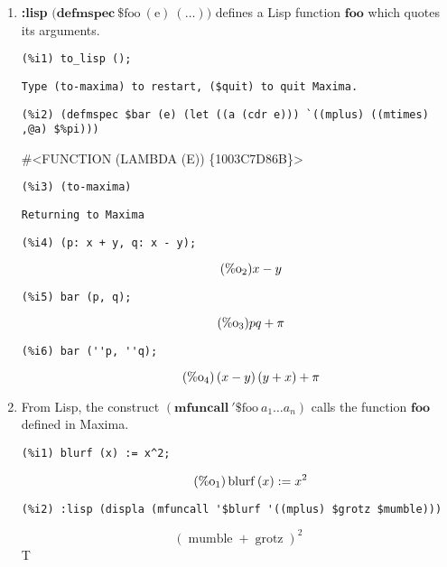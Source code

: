\documentclass[12pt,leqno]{article}
\begin{document}
\begin{enumerate}
\item {\bf :lisp} $\mathrm{(}\mathbf{defmspec\ } \mathrm{\$foo\ (e)\ (\ldots))}$
defines a Lisp function $\mathbf{foo}$ which quotes its arguments.
\begin{verbatim}
(%i1) to_lisp ();
\end{verbatim}
\begin{Verbatim}
Type (to-maxima) to restart, ($quit) to quit Maxima.
\end{Verbatim}
\begin{verbatim}
(%i2) (defmspec $bar (e) (let ((a (cdr e))) `((mplus) ((mtimes) ,@a) $%pi)))
\end{verbatim}
\#\textless FUNCTION (LAMBDA (E)) \{1003C7D86B\}\textgreater 
\begin{verbatim}
(%i3) (to-maxima)
\end{verbatim}
\begin{Verbatim}
Returning to Maxima
\end{Verbatim}
\begin{verbatim}
(%i4) (p: x + y, q: x - y);
\end{verbatim}
\begin{equation}
\tag{$\mathop{\mathrm{\%o}}_{2}$}x-y
\label{eq:doc-group1-code38-4-1}
\end{equation}
\begin{verbatim}
(%i5) bar (p, q);
\end{verbatim}
\begin{equation}
\tag{$\mathop{\mathrm{\%o}}_{3}$}p q+\pi
\label{eq:doc-group1-code38-5-1}
\end{equation}
\begin{verbatim}
(%i6) bar (''p, ''q);
\end{verbatim}
\begin{equation}
\tag{$\mathop{\mathrm{\%o}}_{4}$}\left(x-y\right) \left(y+x\right)+\pi
\label{eq:doc-group1-code38-6-1}
\end{equation}


\item From Lisp, the construct $(\mathbf{mfuncall\ '\$}\mathrm{foo\ }a_1 \ldots a_n)$
calls the function $\mathbf{foo}$ defined in Maxima.

\begin{verbatim}
(%i1) blurf (x) := x^2;
\end{verbatim}
\begin{equation}
\tag{$\mathop{\mathrm{\%o}}_{1}$}\mathop{\mathrm{blurf}}\left(x\right) := {x}^{2}
\label{eq:doc-group1-code39-1-1}
\end{equation}
\begin{verbatim}
(%i2) :lisp (displa (mfuncall '$blurf '((mplus) $grotz $mumble)))
\end{verbatim}
\begin{equation}
{\left(\mathop{\mathrm{mumble}}+\mathop{\mathrm{grotz}}\right)}^{2}
\label{eq:doc-group1-code39-2-1}
\end{equation}
T

\end{enumerate}
\end{document}
